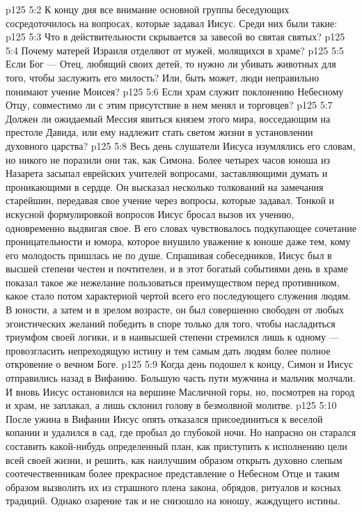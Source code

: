 \vs p125 5:2 К концу дня все внимание основной группы беседующих сосредоточилось на вопросах, которые задавал Иисус. Среди них были такие:
\vs p125 5:3 \bibnobreakspace Что в действительности скрывается за завесой во святая святых?
\vs p125 5:4 \bibnobreakspace Почему матерей Израиля отделяют от мужей, молящихся в храме?
\vs p125 5:5 \bibnobreakspace Если Бог --- Отец, любящий своих детей, то нужно ли убивать животных для того, чтобы заслужить его милость? Или, быть может, люди неправильно понимают учение Моисея?
\vs p125 5:6 \bibnobreakspace Если храм служит поклонению Небесному Отцу, совместимо ли с этим присутствие в нем менял и торговцев?
\vs p125 5:7 \bibnobreakspace Должен ли ожидаемый Мессия явиться князем этого мира, восседающим на престоле Давида, или ему надлежит стать светом жизни в установлении духовного царства?
\vs p125 5:8 \pc Весь день слушатели Иисуса изумлялись его словам, но никого не поразили они так, как Симона. Более четырех часов юноша из Назарета засыпал еврейских учителей вопросами, заставляющими думать и проникающими в сердце. Он высказал несколько толкований на замечания старейшин, передавая свое учение через вопросы, которые задавал. Тонкой и искусной формулировкой вопросов Иисус бросал вызов их учению, одновременно выдвигая свое. В его словах чувствовалось подкупающее сочетание проницательности и юмора, которое внушило уважение к юноше даже тем, кому его молодость пришлась не по душе. Спрашивая собеседников, Иисус был в высшей степени честен и почтителен, и в этот богатый событиями день в храме показал такое же нежелание пользоваться преимуществом перед противником, какое стало потом характерной чертой всего его последующего служения людям. В юности, а затем и в зрелом возрасте, он был совершенно свободен от любых эгоистических желаний победить в споре только для того, чтобы насладиться триумфом своей логики, и в наивысшей степени стремился лишь к одному --- провозгласить непреходящую истину и тем самым дать людям более полное откровение о вечном Боге.
\vs p125 5:9 \pc Когда день подошел к концу, Симон и Иисус отправились назад в Вифанию. Большую часть пути мужчина и мальчик молчали. И вновь Иисус остановился на вершине Масличной горы, но, посмотрев на город и храм, не заплакал, а лишь склонил голову в безмолвной молитве.
\vs p125 5:10 После ужина в Вифании Иисус опять отказался присоединиться к веселой копании и удалился в сад, где пробыл до глубокой ночи. Но напрасно он старался составить какой\hyp{}нибудь определенный план, как приступить к исполнению цели всей своей жизни, и решить, как наилучшим образом открыть духовно слепым соотечественникам более прекрасное представление о Небесном Отце и таким образом вызволить их из страшного плена закона, обрядов, ритуалов и косных традиций. Однако озарение так и не снизошло на юношу, жаждущего истины.
